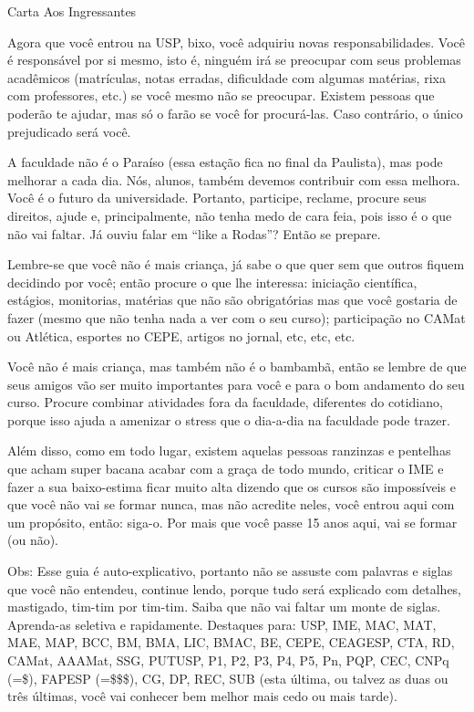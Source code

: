 \begin{secao}{Carta Aos Ingressantes}

Agora que você entrou na USP, bixo, você adquiriu novas responsabilidades. Você é responsável por si mesmo, isto é, ninguém irá se preocupar com seus problemas acadêmicos (matrículas, notas erradas, dificuldade com algumas matérias, rixa com professores, etc.) se você mesmo não se preocupar. Existem pessoas que poderão te ajudar, mas só o farão se você for procurá-las. Caso contrário, o único prejudicado será você.

A faculdade não é o Paraíso (essa estação fica no final da Paulista), mas pode melhorar a cada dia. Nós, alunos, também devemos contribuir com essa melhora. Você é o futuro da universidade. Portanto, participe, reclame, procure seus direitos, ajude e, principalmente, não tenha medo de cara feia, pois isso é o que não vai faltar. Já ouviu falar em “like a Rodas”? Então se prepare. 

Lembre-se que você não é mais criança, já sabe o que quer sem que outros fiquem decidindo por você; então procure o que lhe interessa: iniciação científica, estágios, monitorias, matérias que não são obrigatórias mas que você gostaria de fazer (mesmo que não tenha nada a ver com o seu curso); participação no CAMat ou Atlética, esportes no CEPE, artigos no jornal, etc, etc, etc.

Você não é mais criança, mas também não é o bambambã, então se lembre de que seus amigos vão ser muito importantes para você e para o bom andamento do seu curso. Procure combinar atividades fora da faculdade, diferentes do cotidiano, porque isso ajuda a amenizar o stress que o dia-a-dia na faculdade pode trazer.

Além disso, como em todo lugar, existem aquelas pessoas ranzinzas e pentelhas que acham super bacana acabar com a graça de todo mundo, criticar o IME e fazer a sua baixo-estima ficar muito alta dizendo que os cursos são impossíveis e que você não vai se formar nunca, mas não acredite neles, você entrou aqui com um propósito, então: siga-o. Por mais que você passe 15 anos aqui, vai se formar (ou não).

Obs: Esse guia é auto-explicativo, portanto não se assuste com palavras e siglas
que você não entendeu, continue lendo, porque tudo será explicado com detalhes,
mastigado, tim-tim por tim-tim. Saiba que não vai faltar um monte de siglas.
Aprenda-as seletiva e rapidamente. Destaques para: USP, IME, MAC, MAT, MAE, MAP,
BCC, BM, BMA, LIC, BMAC, BE, CEPE, CEAGESP, CTA, RD, CAMat, AAAMat, SSG, PUTUSP,
P1, P2, P3, P4, P5, Pn, PQP, CEC, CNPq (=\$), FAPESP (=\$\$\$), CG, DP, REC, SUB
(esta última, ou talvez as duas ou três últimas, você vai conhecer bem melhor
mais cedo ou mais tarde).

\end{secao}
